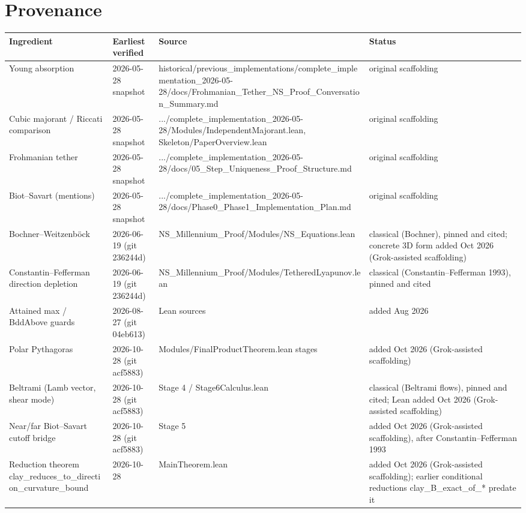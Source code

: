 \documentclass[11pt]{article}
\begin{document}
\section{Provenance}
\begin{longtable}{|p{3cm}|p{2.4cm}|p{5.5cm}|p{4cm}|}\hline Ingredient & Earliest verified & Source & Status\\ \hline
Young absorption & 2026-05-28 snapshot & historical/previous\_implementations/complete\_implementation\_2026-05-28/docs/Frohmanian\_Tether\_NS\_Proof\_Conversation\_Summary.md & original scaffolding \\ \hline
Cubic majorant / Riccati comparison & 2026-05-28 snapshot & .../complete\_implementation\_2026-05-28/Modules/IndependentMajorant.lean, Skeleton/PaperOverview.lean & original scaffolding \\ \hline
Frohmanian tether & 2026-05-28 snapshot & .../complete\_implementation\_2026-05-28/docs/05\_Step\_Uniqueness\_Proof\_Structure.md & original scaffolding \\ \hline
Biot--Savart (mentions) & 2026-05-28 snapshot & .../complete\_implementation\_2026-05-28/docs/Phase0\_Phase1\_Implementation\_Plan.md & original scaffolding \\ \hline
Bochner--Weitzenb\"ock & 2026-06-19 (git 236244d) & NS\_Millennium\_Proof/Modules/NS\_Equations.lean & classical (Bochner), pinned and cited; concrete 3D form added Oct 2026 (Grok-assisted scaffolding) \\ \hline
Constantin--Fefferman direction depletion & 2026-06-19 (git 236244d) & NS\_Millennium\_Proof/Modules/TetheredLyapunov.lean & classical (Constantin--Fefferman 1993), pinned and cited \\ \hline
Attained max / BddAbove guards & 2026-08-27 (git 04eb613) & Lean sources & added Aug 2026 \\ \hline
Polar Pythagoras & 2026-10-28 (git acf5883) & Modules/FinalProductTheorem.lean stages & added Oct 2026 (Grok-assisted scaffolding) \\ \hline
Beltrami (Lamb vector, shear mode) & 2026-10-28 (git acf5883) & Stage 4 / Stage6Calculus.lean & classical (Beltrami flows), pinned and cited; Lean added Oct 2026 (Grok-assisted scaffolding) \\ \hline
Near/far Biot--Savart cutoff bridge & 2026-10-28 (git acf5883) & Stage 5 & added Oct 2026 (Grok-assisted scaffolding), after Constantin--Fefferman 1993 \\ \hline
Reduction theorem clay\_reduces\_to\_direction\_curvature\_bound & 2026-10-28 & MainTheorem.lean & added Oct 2026 (Grok-assisted scaffolding); earlier conditional reductions clay\_B\_exact\_of\_* predate it \\ \hline
\end{longtable}
\end{document}
